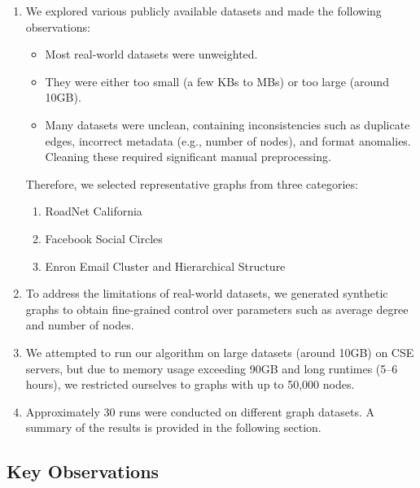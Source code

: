 \documentclass{article}
\begin{document}
\begin{enumerate}
    \item We explored various publicly available datasets and made the following observations:
    \begin{itemize}
        \item Most real-world datasets were unweighted.
        \item They were either too small (a few KBs to MBs) or too large (around 10GB).
        \item Many datasets were unclean, containing inconsistencies such as duplicate edges, incorrect metadata (e.g., number of nodes), and format anomalies. Cleaning these required significant manual preprocessing.
    \end{itemize}
    Therefore, we selected representative graphs from three categories:
    \begin{enumerate}
        \item RoadNet California~\cite{roadnet}
        \item Facebook Social Circles~\cite{facebook}
        \item Enron Email Cluster and Hierarchical Structure~\cite{enron}
    \end{enumerate}

    \item To address the limitations of real-world datasets, we generated synthetic graphs to obtain fine-grained control over parameters such as average degree and number of nodes.

    \item We attempted to run our algorithm on large datasets (around 10GB) on CSE servers, but due to memory usage exceeding 90GB and long runtimes (5--6 hours), we restricted ourselves to graphs with up to 50,000 nodes.

    \item Approximately 30 runs were conducted on different graph datasets. A summary of the results is provided in the following section.
\end{enumerate}

\subsection*{Key Observations}
\end{document}

